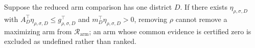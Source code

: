 Suppose the reduced arm comparison has one district \(D\). If there exists \(\eta_{\rho,\sigma,D}\) with \(A_D^\top\eta_{\rho,\sigma,D}\le g_{\rho,\sigma,D}^\top\) and \(m_D^\top\eta_{\rho,\sigma,D}>0\), removing \(\rho\) cannot remove a maximizing arm from \(\mathcal R_{\mathrm{arm}}\); an arm whose common evidence is certified zero is excluded as undefined rather than ranked.